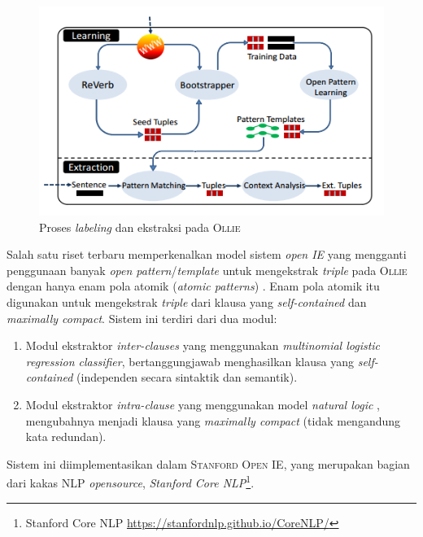\begin{figure}
	\centering
	\includegraphics[scale=0.5]{../images/ollie_architecture.png}
	\caption{Proses \textit{labeling} dan ekstraksi pada \textsc{Ollie}}
	\label{fig:ollie_architecture}
\end{figure}

Salah satu riset terbaru memperkenalkan model sistem \textit{open IE} yang mengganti penggunaan banyak \textit{open pattern}/\textit{template} untuk mengekstrak \textit{triple} pada \textsc{Ollie} \citep{schmitz2012open} dengan hanya enam pola atomik (\textit{atomic patterns}) \citep{angeli2015leveraging}. Enam pola atomik itu digunakan untuk mengekstrak \textit{triple} dari klausa yang \textit{self-contained} dan \textit{maximally compact}. Sistem ini terdiri dari dua modul: 

\begin{enumerate}
	\item Modul ekstraktor \textit{inter-clauses} yang menggunakan \textit{multinomial logistic regression classifier}, bertanggungjawab menghasilkan klausa yang \textit{self-contained} (independen secara sintaktik dan semantik).
	\item Modul ekstraktor \textit{intra-clause} yang menggunakan model \textit{natural logic} \citep{maccartney2007natural}, mengubahnya menjadi klausa yang \textit{maximally compact} (tidak mengandung kata redundan).
\end{enumerate}

Sistem ini diimplementasikan dalam \textsc{Stanford Open IE}, yang merupakan bagian dari kakas NLP \textit{opensource}, \textit{Stanford Core NLP}\footnote{Stanford Core NLP \url{https://stanfordnlp.github.io/CoreNLP/}}.

